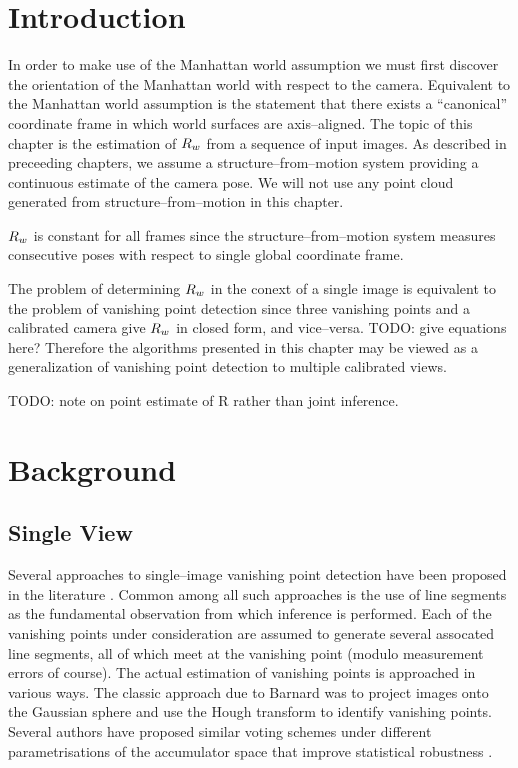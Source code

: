 \section{Introduction}

In order to make use of the Manhattan world assumption we must first
discover the orientation of the Manhattan world with respect to the
camera. Equivalent to the Manhattan world assumption is the statement
that there exists a ``canonical'' coordinate frame in which world
surfaces are axis--aligned. The topic of this chapter is the
estimation of $\SceneR$ from a sequence of input images. As described
in preceeding chapters, we assume a structure--from--motion system
providing a continuous estimate of the camera pose. We will not use
any point cloud generated from structure--from--motion in this
chapter.

$\SceneR$ is constant for all frames since the structure--from--motion
system measures consecutive poses with respect to single global
coordinate frame.

The problem of determining $\SceneR$ in the conext of a single image
is equivalent to the problem of vanishing point detection since three
vanishing points and a calibrated camera give $\SceneR$ in closed
form, and vice--versa. TODO: give equations here? Therefore the
algorithms presented in this chapter may be viewed as a generalization
of vanishing point detection to multiple calibrated views.

TODO: note on point estimate of R rather than joint inference.

\section{Background}

\subsection{Single View}

Several approaches to single--image vanishing point detection have
been proposed in the literature
\cite{Barnard83,Zhang02,Shufelt99}. Common among all such approaches
is the use of line segments as the fundamental observation from which
inference is performed. Each of the vanishing points under
consideration are assumed to generate several assocated line segments,
all of which meet at the vanishing point (modulo measurement errors of
course). The actual estimation of vanishing points is approached in
various ways. The classic approach due to Barnard \cite{Barnard83} was
to project images onto the Gaussian sphere and use the Hough transform
to identify vanishing points. Several authors have proposed similar
voting schemes under different parametrisations of the accumulator
space that improve statistical robustness \cite{Brillaut91}.

